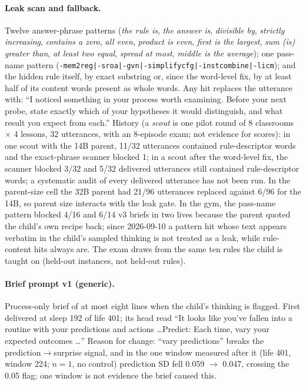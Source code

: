 \documentclass{article}
\begin{document}
\paragraph{Leak scan and fallback.} Twelve answer-phrase patterns (\emph{the rule is}, \emph{the answer is}, \emph{divisible by}, \emph{strictly increasing}, \emph{contains a zero}, \emph{all even}, \emph{product is even}, \emph{first is the largest}, \emph{sum (is) greater than}, \emph{at least two equal}, \emph{spread at most}, \emph{middle is the average}); one pass-name pattern (\texttt{-mem2reg|-sroa|-gvn|-simplifycfg|-instcombine|-licm}); and the hidden rule itself, by exact substring or, since the word-level fix, by at least half of its content words present as whole words. Any hit replaces the utterance with: ``I noticed something in your process worth examining. Before your next probe, state exactly which of your hypotheses it would distinguish, and what result you expect from each.'' History (a \emph{scout} is one pilot round of 8 classrooms $\times$ 4 lessons, 32 utterances, with an 8-episode exam; not evidence for scores): in one scout with the 14B parent, 11/32 utterances contained rule-descriptor words and the exact-phrase scanner blocked 1; in a scout after the word-level fix, the scanner blocked 3/32 and 5/32 delivered utterances still contained rule-descriptor words; a systematic audit of every delivered utterance has not been run. In the parent-size cell the 32B parent had 21/96 utterances replaced against 6/96 for the 14B, so parent size interacts with the leak gate. In the gym, the pass-name pattern blocked 4/16 and 6/14 v3 briefs in two lives because the parent quoted the child's own recipe back; since 2026-09-10 a pattern hit whose text appears verbatim in the child's sampled thinking is not treated as a leak, while rule-content hits always are. The exam draws from the same ten rules the child is taught on (held-out instances, not held-out rules).

\paragraph{Brief prompt v1 (generic).} Process-only brief of at most eight lines when the child's thinking is flagged. First delivered at sleep 192 of life 401; its head read ``It looks like you've fallen into a routine with your predictions and actions \ldots Predict: Each time, vary your expected outcomes \ldots'' Reason for change: ``vary predictions'' breaks the prediction$\to$surprise signal, and in the one window measured after it (life 401, window 224; $n = 1$, no control) prediction SD fell 0.059 $\to$ 0.047, crossing the 0.05 flag; one window is not evidence the brief caused this.
\end{document}
